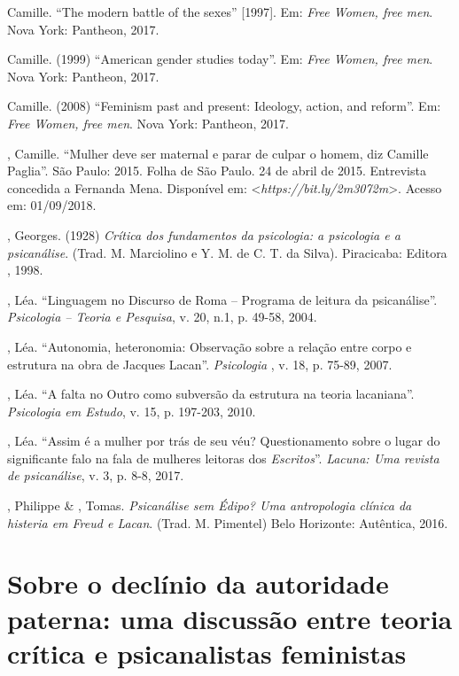  Camille. ``The modern battle of the sexes'' {[}1997{]}. Em:
\emph{Free Women, free men}. Nova York: Pantheon, 2017.

 Camille. (1999) ``American gender studies today''. Em: \emph{Free
Women, free men}. Nova York: Pantheon, 2017.

 Camille. (2008) ``Feminism past and present: Ideology, action,
and reform''. Em: \emph{Free Women, free men}. Nova York: Pantheon,
2017.

, Camille. ``Mulher deve ser maternal e parar de culpar o homem,
diz Camille Paglia''. São Paulo: 2015. Folha de São Paulo. 24 de abril
de 2015. Entrevista concedida a Fernanda Mena. Disponível em:
\textless{}\emph{https://bit.ly/2m3072m}\textgreater{}.
Acesso em: 01/09/2018.

, Georges. (1928) \emph{Crítica dos fundamentos da psicologia: a
psicologia e a psicanálise}. (Trad. M. Marciolino e Y. M. de C. T. da
Silva). Piracicaba: Editora , 1998.

, Léa. ``Linguagem no Discurso de Roma -- Programa de leitura da
psicanálise''. \emph{Psicologia -- Teoria e Pesquisa}, v. 20, n.1, p.
49-58, 2004.

, Léa. ``Autonomia, heteronomia: Observação sobre a relação
entre corpo e estrutura na obra de Jacques Lacan''. \emph{Psicologia
}, v. 18, p. 75-89, 2007.

, Léa. ``A falta no Outro como subversão da estrutura na teoria
lacaniana''. \emph{Psicologia em Estudo}, v. 15, p. 197-203, 2010.

, Léa. ``Assim é a mulher por trás de seu véu? Questionamento
sobre o lugar do significante falo na fala de mulheres leitoras dos
\emph{Escritos}''. \emph{Lacuna: Uma revista de psicanálise}, v. 3, p.
8-8, 2017.

, Philippe \& , Tomas. \emph{Psicanálise sem Édipo? Uma
antropologia clínica da histeria em Freud e Lacan}. (Trad. M. Pimentel)
Belo Horizonte: Autêntica, 2016.

\chapter*{Sobre o declínio da autoridade paterna: uma discussão entre
teoria crítica e psicanalistas feministas}


